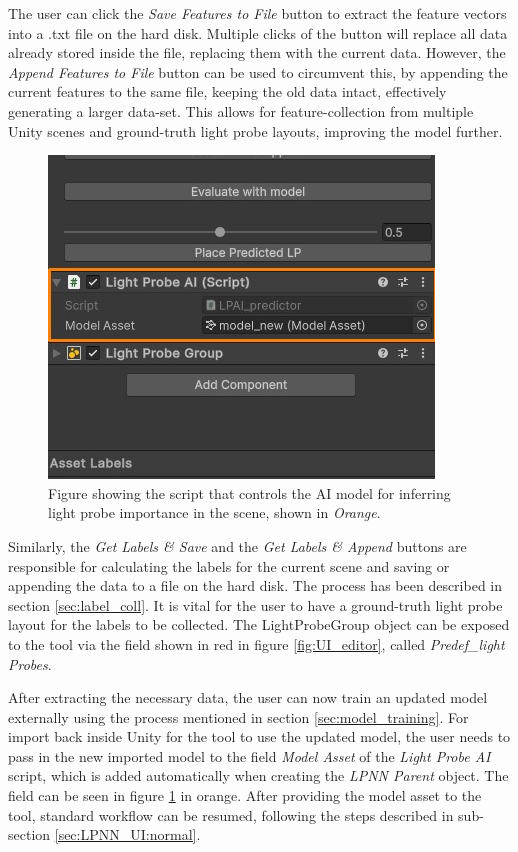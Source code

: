 The user can click the \textit{Save Features to File} button to extract the feature vectors into a .txt file on the hard disk. Multiple clicks of the button will replace all data already stored inside the file, replacing them with the current data. However, the \textit{Append Features to File} button can be used to circumvent this, by appending the current features to the same file, keeping the old data intact, effectively generating a larger data-set. This allows for feature-collection from multiple Unity scenes and ground-truth light probe layouts, improving the model further.

\begin{figure}[h]
	\centering
	\includegraphics[scale=0.7]{Graphics/UI_ai.jpg}
	\caption{Figure showing the script that controls the AI model for inferring light probe importance in the scene, shown in \textit{Orange}.}
	\label{fig:UI_ai}
\end{figure}

Similarly, the \textit{Get Labels \& Save} and the \textit{Get Labels \& Append} buttons are responsible for calculating the labels for the current scene and saving or appending the data to a file on the hard disk. The process has been described in section \ref{sec:label_coll}. It is vital for the user to have a ground-truth light probe layout for the labels to be collected. The LightProbeGroup object can be exposed to the tool via the field shown in red in figure \ref{fig:UI_editor}, called \textit{Predef\_light Probes}.

After extracting the necessary data, the user can now train an updated model externally using the process mentioned in section \ref{sec:model_training}. For import back inside Unity for the tool to use the updated model, the user needs to pass in the new imported model to the field \textit{Model Asset} of the \textit{Light Probe AI} script, which is added automatically when creating the \textit{LPNN Parent} object. The field can be seen in figure \ref{fig:UI_ai} in orange. After providing the model asset to the tool, standard workflow can be resumed, following the steps described in sub-section \ref{sec:LPNN_UI:normal}.

